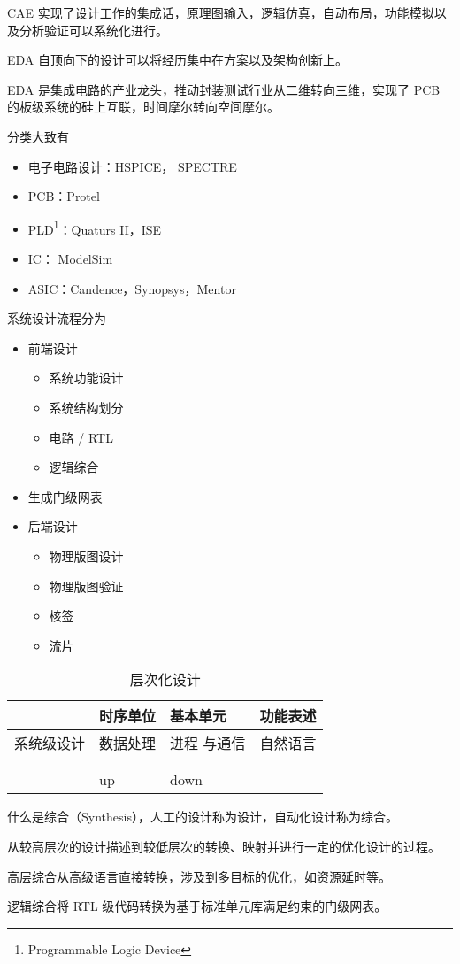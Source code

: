 \documentclass[cn,11pt,chinese,black,simple]{../elegantbook}
\begin{document}
CAE 实现了设计工作的集成话，原理图输入，逻辑仿真，自动布局，功能模拟以及分析验证可以系统化进行。

EDA 自顶向下的设计可以将经历集中在方案以及架构创新上。

EDA 是集成电路的产业龙头，推动封装测试行业从二维转向三维，实现了 PCB 的板级系统的硅上互联，时间摩尔转向空间摩尔。

分类大致有

\begin{itemize}
    \item 电子电路设计：HSPICE， SPECTRE
    \item PCB：Protel
    \item PLD\footnote{Programmable Logic Device}：Quaturs II，ISE
    \item IC： ModelSim
    \item ASIC：Candence，Synopsys，Mentor
\end{itemize}


系统设计流程分为 

\begin{itemize}
    \item 前端设计
    \begin{itemize}
        \item 系统功能设计
        \item 系统结构划分
        \item 电路 / RTL 
        \item 逻辑综合
    \end{itemize}
    \item 生成门级网表
    \item 后端设计
    \begin{itemize}
        \item 物理版图设计
        \item 物理版图验证
        \item 核签
        \item 流片
    \end{itemize}
\end{itemize}

\begin{table}[htb]
    \centering
    \caption{层次化设计}
    \begin{tabular}{llll}
    \hline
          & 时序单位 & 基本单元   & 功能表述 \\ \hline
    系统级设计 & 数据处理 & 进程 与通信 & 自然语言 \\
          &      &        &      \\
          &      &        &      \\
          & up   & down   &      \\ \hline
    \end{tabular}
    \end{table}

什么是综合（Synthesis），人工的设计称为设计，自动化设计称为综合。

\begin{definition}[综合]
    从较高层次的设计描述到较低层次的转换、映射并进行一定的优化设计的过程。
\end{definition}

高层综合从高级语言直接转换，涉及到多目标的优化，如资源延时等。

逻辑综合将 RTL 级代码转换为基于标准单元库满足约束的门级网表。




\let\chapname\undefined
\ifx\mainclass\undefined
\end{document}
